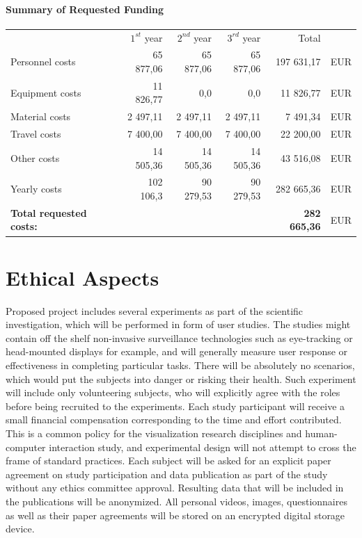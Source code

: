 \documentclass[11pt,a4paper,titlepage,oneside,onecolumn]{article}
\begin{document}
\paragraph{Summary of Requested Funding}
\begin{center}
\begin{tabular}{lrrrrl}
                        & $1^{st}$ year  &  $2^{nd}$ year & $3^{rd}$ year & Total & \\
Personnel costs   &  65 877,06 & 65 877,06 & 65 877,06  & 197 631,17 & EUR \\
Equipment costs   &  11 826,77 &  0,0 &  0,0 &  11 826,77 & EUR \\
Material costs    &  2 497,11  &  2 497,11  &  2 497,11  &  7 491,34 & EUR \\
Travel costs      &  7 400,00  & 7 400,00   & 7 400,00  &  22 200,00 & EUR \\
Other costs       &  14	505,36  & 14 505,36  & 14	505,36  &  43 516,08 & EUR \\
Yearly costs      & 102 106,3 & 90 279,53 & 90 279,53  & 282 665,36 & EUR \\
\hline
\textbf{Total requested costs:}    &   & & & \textbf{282 665,36} & EUR \\
\end{tabular}
\end{center}

\section{Ethical Aspects}
Proposed project includes several experiments as part of the scientific investigation, which will be performed in form of user studies. 
The studies might contain off the shelf non-invasive surveillance technologies such as eye-tracking or head-mounted displays for example, and will generally measure user response or effectiveness in completing particular tasks. 
There will be absolutely no scenarios, which would put the subjects into danger or risking their health. 
Such experiment will include only volunteering subjects, who will explicitly agree with the roles before being recruited to the experiments. 
Each study participant will receive a small financial compensation corresponding to the time and effort contributed. 
This is a common policy for the visualization research disciplines and human-computer interaction study, and experimental design will not attempt to cross the frame of standard practices. 
Each subject will be asked for an explicit paper agreement on study participation and data publication as part of the study without any ethics committee approval. 
Resulting data that will be included in the publications will be anonymized. 
All personal videos, images, questionnaires as well as their paper agreements will be stored on an encrypted digital storage device.

\newpage
{}
\linespread{1.0}
\begin{small}


\end{small}
\end{document}
